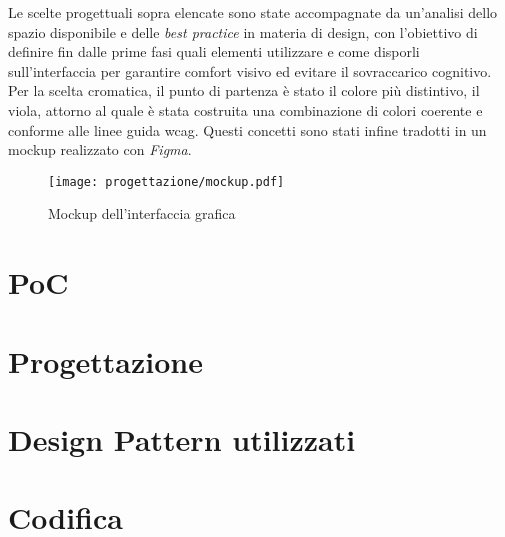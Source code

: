 \vspace{10pt}
\par\noindent Le scelte progettuali sopra elencate sono state accompagnate da un’analisi dello spazio disponibile e delle \textit{best practice} in materia di design, con l’obiettivo di definire fin dalle prime fasi quali elementi utilizzare e come disporli sull’interfaccia per garantire comfort visivo ed evitare il sovraccarico cognitivo. Per la scelta cromatica, il punto di partenza è stato il colore più distintivo, il viola, attorno al quale è stata costruita una combinazione di colori coerente e conforme alle linee guida \gls{wcag}. Questi concetti sono stati infine tradotti in un mockup realizzato con \textit{Figma}.

\begin{figure}[H]
    \centering 
    \texttt{[image: progettazione/mockup.pdf]} 
    \caption{Mockup dell'interfaccia grafica}
\end{figure}

\section{PoC}
\label{sec:poc}

\section{Progettazione}
\label{sec:progettazione}

\section{Design Pattern utilizzati}
\label{sec:design-pattern}

\section{Codifica}
\label{sec:codifica}
